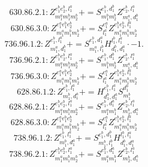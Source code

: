 \documentclass[letterpaper,10pt,fleqn,leqno,onecolumn]{article}
\begin{document}
\begin{equation} \;\;\;\;\;\;  630.86.2.1: Z^{e_{1}^{b}e_{2}^{b},l_{1}^{a}}_{m_{1}^{a}m_{1}^{b}m_{2}^{b}}+=S^{e_{1}^{b},d_{1}^{b}}_{m_{1}^{b}m_{2}^{b}}Z^{e_{2}^{b},l_{1}^{a}}_{m_{1}^{a},d_{1}^{b}} \end{equation}
\begin{equation} \;\;\;\;\;\;  630.86.3.0: Z^{e_{1}^{a}e_{1}^{b}e_{2}^{b}}_{m_{1}^{a}m_{1}^{b}m_{2}^{b}}+=S^{e_{1}^{a}}_{l_{1}^{a}}Z^{e_{1}^{b}e_{2}^{b},l_{1}^{a}}_{m_{1}^{a}m_{1}^{b}m_{2}^{b}} \end{equation}
\begin{equation} \;\;\;\;\;\;  736.96.1.2: Z^{e_{1}^{b},l_{1}^{a}}_{m_{1}^{a},d_{1}^{b}}+=S^{e_{1}^{b},d_{1}^{a}}_{m_{1}^{a},l_{1}^{b}}H^{l_{1}^{b},l_{1}^{a}}_{d_{1}^{b},d_{1}^{a}}\cdot -1. \end{equation}
\begin{equation} \;\;\;\;\;\;  736.96.2.1: Z^{e_{1}^{b}e_{2}^{b},l_{1}^{a}}_{m_{1}^{a}m_{1}^{b}m_{2}^{b}}+=S^{e_{1}^{b},d_{1}^{b}}_{m_{1}^{b}m_{2}^{b}}Z^{e_{2}^{b},l_{1}^{a}}_{m_{1}^{a},d_{1}^{b}} \end{equation}
\begin{equation} \;\;\;\;\;\;  736.96.3.0: Z^{e_{1}^{a}e_{1}^{b}e_{2}^{b}}_{m_{1}^{a}m_{1}^{b}m_{2}^{b}}+=S^{e_{1}^{a}}_{l_{1}^{a}}Z^{e_{1}^{b}e_{2}^{b},l_{1}^{a}}_{m_{1}^{a}m_{1}^{b}m_{2}^{b}} \end{equation}
\begin{equation} \;\;\;\;\;\;  628.86.1.2: Z^{e_{1}^{b},l_{1}^{a}}_{m_{1}^{b},d_{1}^{a}}+=H^{e_{1}^{b},l_{1}^{a}}_{d_{1}^{b},d_{1}^{a}}S^{d_{1}^{b}}_{m_{1}^{b}} \end{equation}
\begin{equation} \;\;\;\;\;\;  628.86.2.1: Z^{e_{1}^{b}e_{2}^{b},l_{1}^{a}}_{m_{1}^{a}m_{1}^{b}m_{2}^{b}}+=S^{e_{1}^{b},d_{1}^{a}}_{m_{1}^{a}m_{1}^{b}}Z^{e_{2}^{b},l_{1}^{a}}_{m_{2}^{b},d_{1}^{a}} \end{equation}
\begin{equation} \;\;\;\;\;\;  628.86.3.0: Z^{e_{1}^{a}e_{1}^{b}e_{2}^{b}}_{m_{1}^{a}m_{1}^{b}m_{2}^{b}}+=S^{e_{1}^{a}}_{l_{1}^{a}}Z^{e_{1}^{b}e_{2}^{b},l_{1}^{a}}_{m_{1}^{a}m_{1}^{b}m_{2}^{b}} \end{equation}
\begin{equation} \;\;\;\;\;\;  738.96.1.2: Z^{e_{1}^{b},l_{1}^{a}}_{m_{1}^{b},d_{1}^{a}}+=S^{e_{1}^{b},d_{1}^{b}}_{m_{1}^{b},l_{1}^{b}}H^{l_{1}^{b},l_{1}^{a}}_{d_{1}^{b},d_{1}^{a}} \end{equation}
\begin{equation} \;\;\;\;\;\;  738.96.2.1: Z^{e_{1}^{b}e_{2}^{b},l_{1}^{a}}_{m_{1}^{a}m_{1}^{b}m_{2}^{b}}+=S^{e_{1}^{b},d_{1}^{a}}_{m_{1}^{a}m_{1}^{b}}Z^{e_{2}^{b},l_{1}^{a}}_{m_{2}^{b},d_{1}^{a}} \end{equation}
\end{document}
